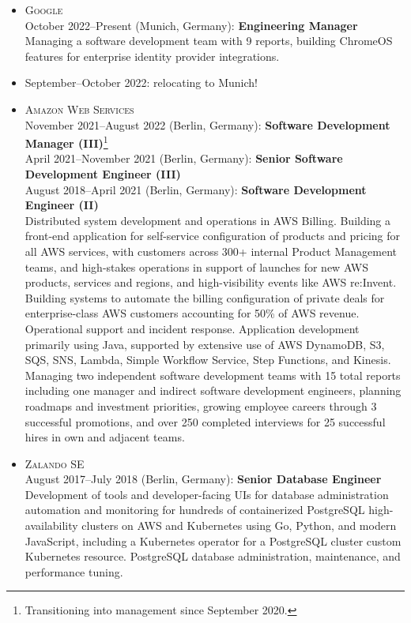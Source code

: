 \documentclass{res}
\begin{document}
\begin{resume}
\begin{itemize}[leftmargin=-0.3in]
    \item
      \textsc{Google}
      \\ October 2022--Present (Munich, Germany): \textbf{Engineering Manager}
      \\ \small{Managing a software development team with 9 reports, building ChromeOS features for enterprise identity provider integrations.}

    \item September--October 2022: relocating to Munich!

    \item
      \textsc{Amazon Web Services}
      \\ November 2021--August 2022 (Berlin, Germany): \textbf{Software Development Manager (III)}\footnote{Transitioning into management since September 2020.}
      \\ April 2021--November 2021 (Berlin, Germany): \textbf{Senior Software Development Engineer (III)}
      \\ August 2018--April 2021 (Berlin, Germany): \textbf{Software Development Engineer (II)}
      \\ \small{Distributed system development and operations in AWS Billing.  Building a front-end application for self-service configuration of products and pricing for all AWS services, with customers across 300+ internal Product Management teams, and high-stakes operations in support of launches for new AWS products, services and regions, and high-visibility events like AWS re:Invent.  Building systems to automate the billing configuration of private deals for enterprise-class AWS customers accounting for 50\% of AWS revenue.  Operational support and incident response.  Application development primarily using Java, supported by extensive use of AWS DynamoDB, S3, SQS, SNS, Lambda, Simple Workflow Service, Step Functions, and Kinesis.}
      \\ \small{Managing two independent software development teams with 15 total reports including one manager and indirect software development engineers, planning roadmaps and investment priorities, growing employee careers through 3 successful promotions, and over 250 completed interviews for 25 successful hires in own and adjacent teams.}

    \item
      \textsc{Zalando SE}
      \\ August 2017--July 2018 (Berlin, Germany): \textbf{Senior Database Engineer}
      \\ \small{Development of tools and developer-facing UIs for database administration automation and monitoring for hundreds of containerized PostgreSQL high-availability clusters on AWS and Kubernetes using Go, Python, and modern JavaScript, including a Kubernetes operator for a PostgreSQL cluster custom Kubernetes resource. PostgreSQL database administration, maintenance, and performance tuning.}


\end{itemize}
\end{resume}
\end{document}

